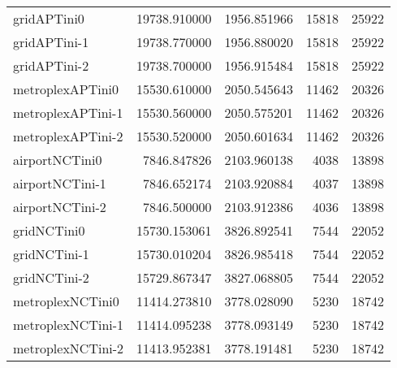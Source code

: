 \begin{table}[h]
\begin{longtable}{lrrrr}
gridAPTini0 & 19738.910000 & 1956.851966 & 15818 & 25922 \\
gridAPTini-1 & 19738.770000 & 1956.880020 & 15818 & 25922 \\
gridAPTini-2 & 19738.700000 & 1956.915484 & 15818 & 25922 \\
metroplexAPTini0 & 15530.610000 & 2050.545643 & 11462 & 20326 \\
metroplexAPTini-1 & 15530.560000 & 2050.575201 & 11462 & 20326 \\
metroplexAPTini-2 & 15530.520000 & 2050.601634 & 11462 & 20326 \\
airportNCTini0 & 7846.847826 & 2103.960138 & 4038 & 13898 \\
airportNCTini-1 & 7846.652174 & 2103.920884 & 4037 & 13898 \\
airportNCTini-2 & 7846.500000 & 2103.912386 & 4036 & 13898 \\
gridNCTini0 & 15730.153061 & 3826.892541 & 7544 & 22052 \\
gridNCTini-1 & 15730.010204 & 3826.985418 & 7544 & 22052 \\
gridNCTini-2 & 15729.867347 & 3827.068805 & 7544 & 22052 \\
metroplexNCTini0 & 11414.273810 & 3778.028090 & 5230 & 18742 \\
metroplexNCTini-1 & 11414.095238 & 3778.093149 & 5230 & 18742 \\
metroplexNCTini-2 & 11413.952381 & 3778.191481 & 5230 & 18742 \\
\end{longtable}
\end{table}

